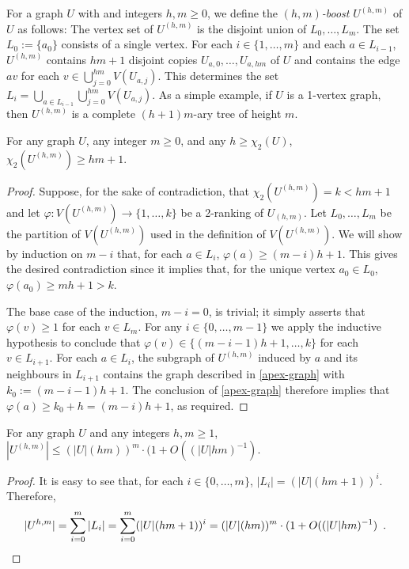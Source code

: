 \documentclass[kpfonts]{patmorin}
\newcommand{\trn}{\chi_2}
\theoremstyle{named}
\begin{document}
For a graph $U$ with and integers $h,m\ge 0$, we define the \emph{$(h,m)$-boost} $U^{(h,m)}$ of $U$ as follows: The vertex set of $U^{(h,m)}$ is the disjoint union of $L_0,\ldots,L_m$.  The set $L_0:=\{a_0\}$ consists of a single vertex. For each $i\in\{1,\ldots,m\}$ and each $a\in L_{i-1}$, $U^{(h,m)}$ contains $hm+1$ disjoint copies $U_{a,0},\ldots,U_{a,hm}$ of $U$ and contains the edge $av$ for each $v\in\bigcup_{j=0}^{hm} V(U_{a,j})$.  This determines the set $L_i=\bigcup_{a\in L_{i-1}}\bigcup_{j=0}^{hm} V(U_{a,j})$.  As a simple example, if $U$ is a 1-vertex graph, then $U^{(h,m)}$ is a complete $(h+1)m$-ary tree of height $m$.

\begin{lem}\label{boost}
    For any graph $U$, any integer $m\ge 0$, and any $h\ge\trn(U)$, $\trn(U^{(h,m)})\ge hm +1$.
\end{lem}

\begin{proof}
    Suppose, for the sake of contradiction, that $\trn(U^{(h,m)})=k<hm+1$ and let $\varphi:V(U^{(h,m)})\to\{1,\ldots,k\}$ be a 2-ranking of $U_{(h,m)}$.  Let $L_0,\ldots,L_{m}$ be the partition of $V(U^{(h,m)})$ used in the definition of $V(U^{(h,m)})$.
    We will show by induction on $m-i$ that, for each $a\in L_{i}$, $\varphi(a)\ge(m-i)h+1$. This gives the desired contradiction since it implies that, for the unique vertex $a_0\in L_0$, $\varphi(a_0)\ge m h+1 > k$.

    The base case of the induction, $m-i=0$, is trivial; it simply asserts that $\varphi(v)\ge 1$ for each $v\in L_m$.  For any $i\in\{0,\ldots,m-1\}$ we apply the inductive hypothesis to conclude that $\varphi(v)\in\{(m-i-1)h+1,\ldots,k\}$ for each $v\in L_{i+1}$.  For each $a\in L_i$, the subgraph of $U^{(h,m)}$ induced by $a$ and its neighbours in $L_{i+1}$ contains the graph described in \cref{apex-graph} with $k_0:=(m-i-1)h+1$.  The conclusion of \cref{apex-graph} therefore implies that $\varphi(a)\ge k_0+h=(m-i)h+1$, as required.
\end{proof}

\begin{lem}\label{boost-size}
    For any graph $U$ and any integers $h,m \ge 1$, $|U^{(h,m)}| \le (|U|(hm))^{m}\cdot (1+O((|U|hm)^{-1})$.
\end{lem}

\begin{proof}
    It is easy to see that, for each $i\in \{0,\ldots,m\}$, $|L_i|=(|U|(hm+1))^i$.  Therefore,
    \[ |U^{h,m}| = \sum_{i=0}^m |L_i| = \sum_{i=0}^m (|U|(hm+1))^i = (|U|(hm))^{m}\cdot (1+O((|U|hm)^{-1}) \enspace . \qedhere
    \]
\end{proof}
\end{document}
